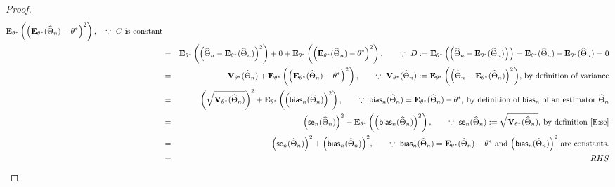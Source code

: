 \begin{prop}
{\begin{proof}
\begin{eqnarray}
\mathbf{E}_{\theta^*} \left( {\left(\mathbf{E}_{\theta^*}(\widehat{\Theta}_n) -\theta^* \right)}^2  \right), \quad \text{$\because \ C$ 
is constant} \notag \\
&=& \mathbf{E}_{\theta^*} \left( {\left(\widehat{\Theta}_n -\mathbf{E}_{\theta^*}(\widehat{\Theta}_n) \right)}^2 \right) + 
0 + 
\mathbf{E}_{\theta^*} \left( {\left(\mathbf{E}_{\theta^*}(\widehat{\Theta}_n) -\theta^* \right)}^2  \right), \qquad \text{$\because \ D := \mathbf{E}_{\theta^*} \left(  {\left(\widehat{\Theta}_n -\mathbf{E}_{\theta^*}(\widehat{\Theta}_n) \right)} \right)=\mathbf{E}_{\theta^*}(\widehat{\Theta}_n ) - \mathbf{E}_{\theta^*}(\widehat{\Theta}_n) = 0$} \notag \\
&=& \mathbf{V}_{\theta^*}(\widehat{\Theta}_n)+ 
\mathbf{E}_{\theta^*} \left( {\left(\mathbf{E}_{\theta^*}(\widehat{\Theta}_n) -\theta^* \right)}^2  \right), \qquad \text{$\because \ \mathbf{V}_{\theta^*}(\widehat{\Theta}_n) := \mathbf{E}_{\theta^*} \left( {\left(\widehat{\Theta}_n -\mathbf{E}_{\theta^*}(\widehat{\Theta}_n) \right)}^2 \right)$, by definition of variance} \notag \\
&=& \left( \sqrt{\mathbf{V}_{\theta^*}(\widehat{\Theta}_n)} \right)^2+ 
\mathbf{E}_{\theta^*} \left( {\left( \mathsf{bias}_n(\widehat{\Theta}_n) \right)}^2  \right), \qquad \text{$\because \  \mathsf{bias}_n(\widehat{\Theta}_n) = \mathbf{E}_{\theta^*}(\widehat{\Theta}_n) -\theta^* $, by definition of $\mathsf{bias}_n$ of an estimator $\widehat{\Theta}_n$} \notag \\
&=&  \left(  \mathsf{se}_n(\widehat{\Theta}_n) \right)^2 + 
\mathbf{E}_{\theta^*} \left( {\left( \mathsf{bias}_n(\widehat{\Theta}_n) \right)}^2  \right) , \qquad 
\text{$\because \ \mathsf{se}_n(\widehat{\Theta}_n) := \sqrt{\mathbf{V}_{\theta^*}(\widehat{\Theta}_n)}$, by definition \eqref{E:se}} \notag \\
&=&  \left(  \mathsf{se}_n(\widehat{\Theta}_n) \right)^2 + 
 {\left( \mathsf{bias}_n(\widehat{\Theta}_n) \right)}^2, \qquad 
\text{$\because \  \mathsf{bias}_n(\widehat{\Theta}_n) = \mathbf{E}_{\theta^*}(\widehat{\Theta}_n) -\theta^*$ and $\left( \mathsf{bias}_n(\widehat{\Theta}_n) \right)^2$ are constants.} \notag \\
&=& RHS \notag 
\end{eqnarray}
\end{proof}
}
\end{prop}

